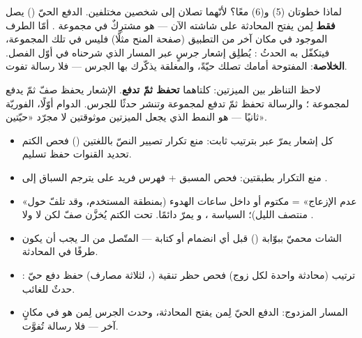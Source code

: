\begin{keyp}
لماذا خطوتان (5) و(6) معًا؟ لأنّهما تصلان إلى شخصين مختلفين. الدفع الحيّ
() يصل \textbf{فقط} لِمن يفتح المحادثة على شاشته الآن —
هو مشترِكٌ في مجموعة . أمّا الطرف الموجود في مكان آخر من
التطبيق (صفحة المنح مثلًا) فليس في تلك المجموعة، فيتكفّل به الحدثُ
: يُطلِق إشعار جرسٍ عبر المسار الذي شرحناه في أوّل
الفصل. \textbf{الخلاصة}: المفتوحة أمامك تصلك حيّةً، والمغلقة يذكّرك بها الجرس — فلا
رسالة تفوت.
\end{keyp}

\begin{note}
لاحظ التناظر بين الميزتين: كلتاهما \textbf{تحفظ ثمّ تدفع}. الإشعار يحفظ صفّ
 ثمّ يدفع لمجموعة ؛ والرسالة تحفظ 
ثمّ تدفع لمجموعة  \emph{و}تنشر حدثًا للجرس. الدوام أوّلًا،
الفوريّة ثانيًا — هو النمط الذي يجعل الميزتين موثوقتين لا مجرّد «حيّتين».
\end{note}

\begin{summary}
\begin{itemize}
\item كل إشعار يمرّ عبر  بترتيب ثابت: منع تكرار
  \en{$\rightarrow$} تصيير النصّ باللغتين () \en{$\rightarrow$}
  فحص الكتم \en{$\rightarrow$} تحديد القنوات \en{$\rightarrow$} حفظ \en{$\rightarrow$}
  تسليم.
\item منع التكرار بطبقتين: فحص  المسبق + فهرس فريد على
   يترجم السباق إلى .
\item «عدم الإزعاج» = مكتوم أو داخل ساعات الهدوء (بمنطقة المستخدم، وقد تلفّ حول منتصف
  الليل)؛ السياسة ، و يمرّ دائمًا. تحت الكتم يُخزَّن
  صفّ  لكن لا  ولا .
\item الشات محميّ ببوّابة  () قبل أي
  انضمام أو كتابة — المتّصل من الـ يجب أن يكون طرفًا في المحادثة.
\item {}: ترتيب  (محادثة واحدة لكل زوج)
  \en{$\rightarrow$} فحص حظر \en{$\rightarrow$} تنقية  (، لثلاثة
  مصارف) \en{$\rightarrow$} حفظ \en{$\rightarrow$} دفع حيّ \en{$\rightarrow$} حدثٌ
  للغائب.
\item المسار المزدوج: الدفع الحيّ لِمن يفتح المحادثة، وحدث الجرس لِمن هو في مكانٍ
  آخر — فلا رسالة تُفوَّت.
\end{itemize}
\end{summary}
